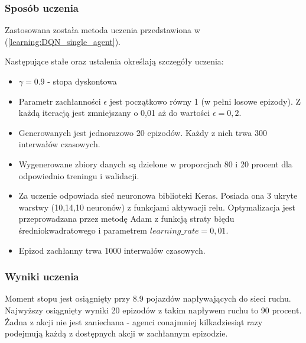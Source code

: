 \documentclass[12pt]{book}
\theoremstyle{plain}
\newcommand{\myref}[1]{(\ref{#1})}
\begin{document}
\subsubsection*{Sposób uczenia}
Zastosowana została metoda uczenia przedstawiona w \myref{learning:DQN_single_agent}. 

Następujące stałe oraz ustalenia określają szczegóły uczenia:
\begin{itemize}
	\item $\gamma = 0.9$ - stopa dyskontowa
	\item Parametr zachłanności $\epsilon$ jest początkowo równy 1 (w pełni losowe epizody). Z każdą iteracją jest zmniejszany o 0,01 aż do wartości $\epsilon=0,2$.
	\item Generowanych jest jednorazowo 20 epizodów. Każdy z nich trwa 300 interwałów czasowych.
	\item Wygenerowane zbiory danych są dzielone w proporcjach 80 i 20 procent dla odpowiednio treningu i walidacji.
	\item Za uczenie odpowiada sieć neuronowa biblioteki Keras. Posiada ona 3 ukryte warstwy (10,14,10 neuronów) z funkcjami aktywacji relu. Optymalizacja jest przeprowadzana przez metodę Adam z funkcją straty błędu średniokwadratowego i parametrem $learning\_rate = 0,01$. 
	\item Epizod zachłanny trwa 1000 interwałów czasowych.
\end{itemize}
\subsubsection{Wyniki uczenia}
Moment stopu jest osiągnięty przy 8.9 pojazdów napływających do sieci ruchu. Najwyższy osiągnięty wyniki 20 epizodów z takim napływem ruchu to 90 procent. Żadna z akcji nie jest zaniechana - agenci conajmniej kilkadziesiąt razy podejmują każdą z dostępnych akcji w zachłannym epizodzie.
\end{document}
